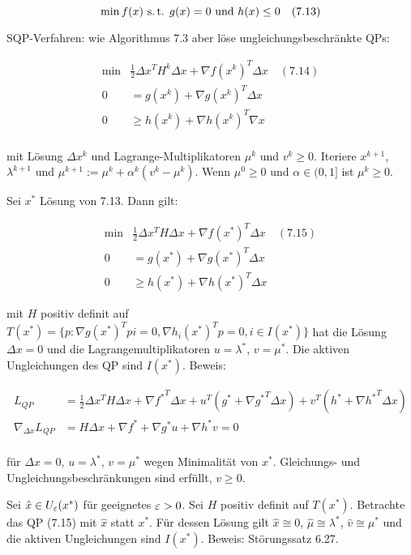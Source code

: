 \[ \min f(x) \text{ s.\,t. } g(x) = 0 \text{ und } h(x) \leq 0 \quad (7.13) \]

SQP-Verfahren: wie Algorithmus 7.3 aber löse ungleichungsbeschränkte QPs:

\begin{align*}
\min &\frac 12 \Delta x^T H^k \Delta x + \nabla f(x^k)^T \Delta x  \quad (7.14) \\
0 &= g(x^k) + \nabla g(x^k)^T \Delta x \\
0 & \geq h(x^k) + \nabla h(x^k)^T \nabla x \\
\end{align*}

mit Lösung $\Delta x^k$ und Lagrange-Multiplikatoren $\mu^k$ und $v^k \geq 0$. Iteriere $x^{k+1}$, $\lambda^{k+1}$ und $\mu^{k+1} := \mu^k + \alpha^k (v^k - \mu^k)$. Wenn $\mu^0 \geq 0$ und $\alpha \in (0,1]$ ist $\mu^k \geq 0$.



Sei $x^*$ Lösung von 7.13. Dann gilt:

\begin{align*}
\min &\frac 12 \Delta x^T H \Delta x + \nabla f(x^*)^T \Delta x \quad (7.15)\\
0 &= g(x^*) + \nabla g(x^*)^T \Delta x \\
0 & \geq h(x^*) + \nabla h(x^*)^T \Delta x
\end{align*}

mit $H$ positiv definit auf $T(x^*) = \{ p: \nabla g(x^*)^T pi = 0, \nabla h_i (x^*)^T p = 0, i \in I(x^*) \}$ hat die Lösung $\Delta x = 0$ und die Lagrangemultiplikatoren $u = \lambda^*$, $v = \mu^*$. Die aktiven Ungleichungen des QP sind $I(x^*)$. Beweis:

\begin{align*}
L_{QP} &= \frac 12 \Delta x^T H \Delta x + \nabla {f^*}^T \Delta x + u^T (g^* + \nabla {g^*}^T \Delta x) + v^T (h^* + \nabla {h^*}^T \Delta x) \\
\nabla_{\Delta x} L_{QP} &= H \Delta x + \nabla f^* + \nabla g^* u + \nabla h^* v = 0 \\
\end{align*}

für $\Delta x = 0$, $u = \lambda^*$, $v = \mu^*$ wegen Minimalität von $x^*$. Gleichungs- und Ungleichungsbeschränkungen sind erfüllt, $v \geq 0$.


Sei $\hat x \in U_\varepsilon (x^*)$ für geeignetes $\varepsilon>0$. Sei $H$ positiv definit auf $T(x^*)$. Betrachte das QP (7.15) mit $\hat x$ statt $x^*$. Für dessen Lösung gilt $\hat x \cong 0$, $\hat \mu \cong \lambda^*$, $\hat v \cong \mu^*$ und die aktiven Ungleichungen sind $I(x^*)$. Beweis: Störungssatz 6.27.

